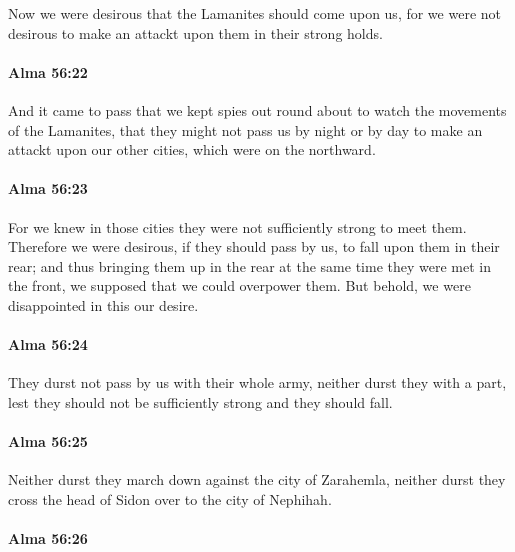 			Now we were desirous that the Lamanites should come upon us,
			for we were not desirous to make an attackt upon them in their strong holds.

		\paragraph{Alma 56:22} %
			\label{ALMA-56-22}

			And it came to pass that we kept spies out round about
			to watch the movements of the Lamanites,
			that they might not pass us by night or by day
			to make an attackt upon our other cities, which were on the northward.

		\paragraph{Alma 56:23} %
			\label{ALMA-56-23}

			For we knew in those cities they were not sufficiently strong to meet them.
			Therefore we were desirous, if they should pass by us,
			to fall upon them in their rear;
			and thus bringing them up in the rear
			at the same time they were met in the front,
			we supposed that we could overpower them.
			But behold, we were disappointed in this our desire.

		\paragraph{Alma 56:24} %
			\label{ALMA-56-24}

			They durst not pass by us with their whole army,
			neither durst they with a part,
			lest they should not be sufficiently strong and they should fall.

		\paragraph{Alma 56:25} %
			\label{ALMA-56-25}

			Neither durst they march down against the city of Zarahemla,
			neither durst they cross the head of Sidon over to the city of Nephihah.

		\paragraph{Alma 56:26} %
			\label{ALMA-56-26}

